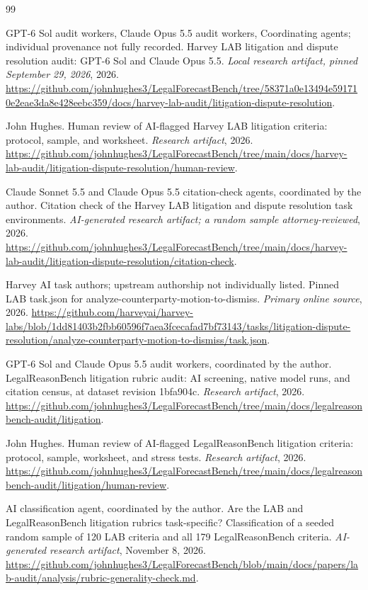 \documentclass[11pt]{article}
\begin{document}
\clearpage
\begin{thebibliography}{99}

 GPT-6 Sol audit workers, Claude Opus 5.5 audit workers, Coordinating agents; individual provenance not fully recorded. Harvey LAB litigation and dispute resolution audit: GPT-6 Sol and Claude Opus 5.5. \emph{Local research artifact, pinned September 29, 2026}, 2026. \url{https://github.com/johnhughes3/LegalForecastBench/tree/58371a0e13494e591710e2eae3da8e428eebc359/docs/harvey-lab-audit/litigation-dispute-resolution}.

 John Hughes. Human review of AI-flagged Harvey LAB litigation criteria: protocol, sample, and worksheet. \emph{Research artifact}, 2026. \url{https://github.com/johnhughes3/LegalForecastBench/tree/main/docs/harvey-lab-audit/litigation-dispute-resolution/human-review}.

 Claude Sonnet 5.5 and Claude Opus 5.5 citation-check agents, coordinated by the author. Citation check of the Harvey LAB litigation and dispute resolution task environments. \emph{AI-generated research artifact; a random sample attorney-reviewed}, 2026. \url{https://github.com/johnhughes3/LegalForecastBench/tree/main/docs/harvey-lab-audit/litigation-dispute-resolution/citation-check}.

 Harvey AI task authors; upstream authorship not individually listed. Pinned LAB task.json for analyze-counterparty-motion-to-dismiss. \emph{Primary online source}, 2026. \url{https://github.com/harveyai/harvey-labs/blob/1dd81403b2fbb60596f7aea3fcecafad7bf73143/tasks/litigation-dispute-resolution/analyze-counterparty-motion-to-dismiss/task.json}.

 GPT-6 Sol and Claude Opus 5.5 audit workers, coordinated by the author. LegalReasonBench litigation rubric audit: AI screening, native model runs, and citation census, at dataset revision 1bfa904c. \emph{Research artifact}, 2026. \url{https://github.com/johnhughes3/LegalForecastBench/tree/main/docs/legalreasonbench-audit/litigation}.

 John Hughes. Human review of AI-flagged LegalReasonBench litigation criteria: protocol, sample, worksheet, and stress tests. \emph{Research artifact}, 2026. \url{https://github.com/johnhughes3/LegalForecastBench/tree/main/docs/legalreasonbench-audit/litigation/human-review}.

 AI classification agent, coordinated by the author. Are the LAB and LegalReasonBench litigation rubrics task-specific? Classification of a seeded random sample of 120 LAB criteria and all 179 LegalReasonBench criteria. \emph{AI-generated research artifact}, November 8, 2026. \url{https://github.com/johnhughes3/LegalForecastBench/blob/main/docs/papers/lab-audit/analysis/rubric-generality-check.md}.


\end{thebibliography}
\end{document}
